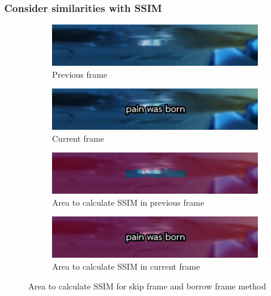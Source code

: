\documentclass[xcolor=dvipsnames, xetex,serif]{beamer}
\begin{document}
    \begin{frame}
        \frametitle{Consider similarities with SSIM}
        \begin{figure}[H]
            \centering
            \begin{subfigure}{0.4\linewidth}
                \centering
                \includegraphics[width=0.95\linewidth]{images/skipborrow/prevframe.png}
                \caption{Previous frame}
            \end{subfigure}
            \begin{subfigure}{0.45\linewidth}
                \centering
                \includegraphics[width=0.95\linewidth]{images/skipborrow/currentframe.png}
                \caption{Current frame}
            \end{subfigure}
            \bigskip
            \begin{subfigure}{0.45\linewidth}
                \centering
                \includegraphics[width=0.95\linewidth]{images/skipborrow/prevframeinverse.png}
                \caption{Area to calculate SSIM in previous frame}
            \end{subfigure}
            \begin{subfigure}{0.4\linewidth}
                \centering
                \includegraphics[width=0.95\linewidth]{images/skipborrow/currentframeinverse.png}
                \caption{Area to calculate SSIM in current frame}
            \end{subfigure}
            \caption{Area to calculate SSIM for skip frame and borrow frame method}
        \end{figure}
    \end{frame}
\end{document}
